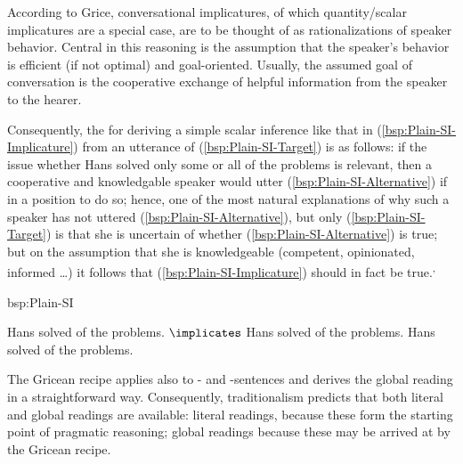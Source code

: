 \documentclass[fleqn,reqno,10pt,draft]{article}
\newcommand{\as}{\acro{as}}
\renewcommand{\es}{\acro{es}}
\begin{document}
According to Grice, conversational implicatures, of which
quantity/scalar implicatures are a special case, are to be thought of
as rationalizations of speaker behavior. Central in this reasoning is
the assumption that the speaker's behavior is efficient (if not
optimal) and goal-oriented. Usually, the assumed goal of conversation
is the cooperative exchange of helpful information from the speaker to
the hearer.

Consequently, the 
\citep[c.f.][]{Geurts2010:Quantity-Implic} for deriving a simple
scalar inference like that in (\ref{bsp:Plain-SI-Implicature}) from an
utterance of (\ref{bsp:Plain-SI-Target}) is as follows: if the issue
whether Hans solved only some or all of the problems is relevant, then
a cooperative and knowledgable speaker would utter
(\ref{bsp:Plain-SI-Alternative}) if in a position to do so; hence, one
of the most natural explanations of why such a speaker has not uttered
(\ref{bsp:Plain-SI-Alternative}), but only (\ref{bsp:Plain-SI-Target})
is that she is uncertain of whether (\ref{bsp:Plain-SI-Alternative})
is true; but on the assumption that she is knowledgeable (competent,
opinionated, informed \dots) it follows that
(\ref{bsp:Plain-SI-Implicature}) should in fact be true.\textsuperscript{,}

\begin{exer}{bsp:Plain-SI}
  \ex 
    \begin{xlist}
      \ex \label{bsp:Plain-SI-Target} Hans solved  of the problems.
      \ex \label{bsp:Plain-SI-Implicature} $\implicates$ Hans solved
         of the problems.
      \ex  \label{bsp:Plain-SI-Alternative}  Hans solved  of the problems.
    \end{xlist}
\end{exer}

The Gricean recipe applies also to \as- and \es-sentences and derives
the global reading in a straightforward way. Consequently,
traditionalism predicts that both literal and global readings are
available: literal readings, because these form the starting point of
pragmatic reasoning; global readings because these may be arrived at
by the Gricean recipe. 
\end{document}
